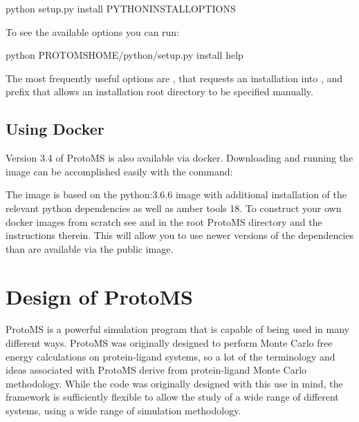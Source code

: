 \documentclass[letterpaper,10pt,english]{sphinxmanual}
\begin{document}
%
\begin{sphinxVerbatim}[commandchars=\\\{\}]
python setup.py install \PYGZdl{}PYTHON\PYGZus{}INSTALL\PYGZus{}OPTIONS
\end{sphinxVerbatim}

To see the available options you can run:

%
\begin{sphinxVerbatim}[commandchars=\\\{\}]
python \PYGZdl{}PROTOMSHOME/python/setup.py install \PYGZhy{}\PYGZhy{}help
\end{sphinxVerbatim}

The most frequently useful options are , that requests an installation into , and \textendash{}prefix that allows an installation root directory to be specified manually.


\section{Using Docker}
\label{\detokenize{compilation:using-docker}}\label{\detokenize{compilation:id1}}
Version 3.4 of ProtoMS is also available via docker. Downloading and running the image can be accomplished easily with the command:

%
\begin{sphinxVerbatim}[commandchars=\\\{\}]
   
\end{sphinxVerbatim}

The image is based on the python:3.6.6 image with additional installation of the relevant python dependencies as well as amber tools 18. To construct your own docker images from scratch see  and  in the root ProtoMS directory and the instructions therein. This will allow you to use newer versions of the dependencies than are available via the public image.


\chapter{Design of ProtoMS}
\label{\detokenize{protoms:design-of-protoms}}\label{\detokenize{protoms::doc}}
\ignorespaces 
ProtoMS is a powerful simulation program that is capable of being used in many different ways. ProtoMS was originally designed to perform Monte Carlo free energy calculations on protein-ligand systems, so a lot of the terminology and ideas associated with ProtoMS derive from protein-ligand Monte Carlo methodology. While the code was originally designed with this use in mind, the framework is sufficiently flexible to allow the study of a wide range of different systems, using a wide range of simulation methodology.
\end{document}
